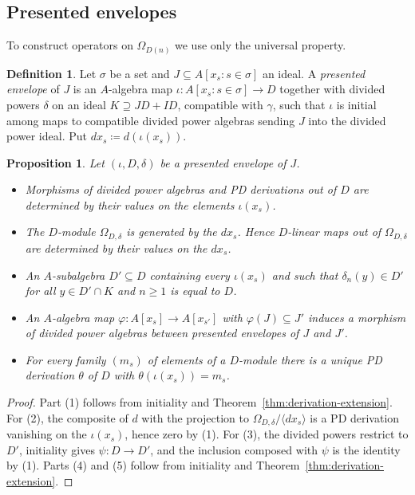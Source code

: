 \documentclass[11pt]{amsart}
\theoremstyle{plain}
\newtheorem{proposition}[theorem]{Proposition}
\theoremstyle{definition}
\newtheorem{definition}[theorem]{Definition}
\theoremstyle{remark}
\begin{document}
\subsection{Presented envelopes}

To construct operators on $\Omega_{D(n)}$ we use only the universal property.

\begin{definition}
Let $\sigma$ be a set and $J \subseteq A[x_s : s \in \sigma]$ an ideal. A \emph{presented envelope} of $J$ is an $A$-algebra map $\iota \colon A[x_s : s \in \sigma] \to D$ together with divided powers $\delta$ on an ideal $K \supseteq JD + ID$, compatible with $\gamma$, such that $\iota$ is initial among maps to compatible divided power algebras sending $J$ into the divided power ideal. Put $dx_s \coloneqq d(\iota(x_s))$.
\end{definition}

\begin{proposition}\label{prop:presented}
Let $(\iota, D, \delta)$ be a presented envelope of $J$.
\begin{itemize}
\item[\normalfont{(1)}] Morphisms of divided power algebras and PD derivations out of $D$ are determined by their values on the elements $\iota(x_s)$.
\item[\normalfont{(2)}] The $D$-module $\Omega_{D,\delta}$ is generated by the $dx_s$. Hence $D$-linear maps out of $\Omega_{D,\delta}$ are determined by their values on the $dx_s$.
\item[\normalfont{(3)}] An $A$-subalgebra $D' \subseteq D$ containing every $\iota(x_s)$ and such that $\delta_n(y) \in D'$ for all $y \in D' \cap K$ and $n \ge 1$ is equal to $D$.
\item[\normalfont{(4)}] An $A$-algebra map $\varphi \colon A[x_s] \to A[x_{s'}]$ with $\varphi(J) \subseteq J'$ induces a morphism of divided power algebras between presented envelopes of $J$ and $J'$.
\item[\normalfont{(5)}] For every family $(m_s)$ of elements of a $D$-module there is a unique PD derivation $\theta$ of $D$ with $\theta(\iota(x_s)) = m_s$.
\end{itemize}
\end{proposition}

\begin{proof}
Part (1) follows from initiality and Theorem~\ref{thm:derivation-extension}. For (2), the composite of $d$ with the projection to $\Omega_{D,\delta}/\langle dx_s\rangle$ is a PD derivation vanishing on the $\iota(x_s)$, hence zero by (1). For (3), the divided powers restrict to $D'$, initiality gives $\psi \colon D \to D'$, and the inclusion composed with $\psi$ is the identity by (1). Parts (4) and (5) follow from initiality and Theorem~\ref{thm:derivation-extension}.
\end{proof}
\end{document}
